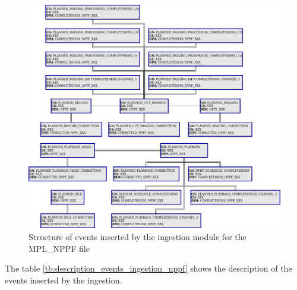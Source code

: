 \begin{figure}[H]
  \begin{center}
	\centering\includegraphics[width=150mm]{../fig/structure_ingestion_nppf.png}
	\caption{Structure of events inserted by the ingestion module for the MPL\_NPPF file}
	\label{fg:structure_ingestion_nppf}
  \end{center}
\end{figure}

The table \ref{tb:description_events_ingestion_nppf} shows the description of the events inserted by the ingestion.


